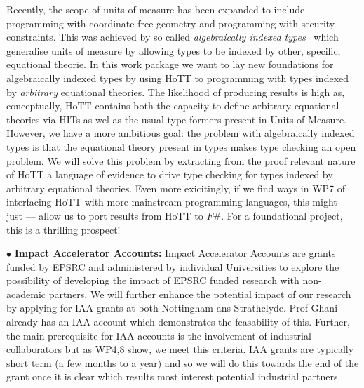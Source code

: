 \documentclass[a4paper,11pt]{article}
\begin{document}
Recently, the scope of units of measure has been expanded to include
programming with coordinate free geometry and programming with
security constraints. This was achieved by so called {\em
  algebraically indexed types}~\cite{ajk} which generalise units of
measure by allowing types to be indexed by other, specific, equational
theorie. In this work package we want to lay new foundations for
algebraically indexed types by using HoTT to programming with types
indexed by {\em arbitrary} equational theories. The likelihood of
producing results is high as, conceptually, HoTT contains both the
capacity to define arbitrary equational theories via HITs as wel as
the usual type formers present in Units of Measure. However, we have a
more ambitious goal: the problem with algebraically indexed types is
that the equational theory present in types makes type checking an
open problem. We will solve this problem by extracting from the proof
relevant nature of HoTT a language of evidence to drive type checking
for types indexed by arbitrary equational theories. Even more
exicitingly, if we find ways in WP7 of interfacing HoTT with more
mainstream programming languages, this might --- just --- allow us to port
results from HoTT to $F\#$.  For a foundational project, this is a
thrilling prospect!


\vspace*{0.02in}

$\bullet$ {\bf Impact Accelerator Accounts:}  Impact Accelerator
Accounts are grants funded by EPSRC and administered by individual
Universities to explore the possibility of developing the impact of
EPSRC funded research with non-academic partners. We will further
enhance the potential impact of our research by applying for IAA
grants at both Nottingham ans Strathclyde. Prof Ghani already has an
IAA account which demonstrates the feasability of this. Further, the
main prerequisite for IAA accounts is the involvement of industrial
collaborators but as WP4,8 show, we meet this criteria. IAA grants
are typically short term (a few months to a year) and so we
will do this towards the end of the grant once it is clear which
results most interest potential industrial partners.

\vspace*{0.02in}
\end{document}
